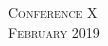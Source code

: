 \documentclass[10pt]{article} %
\begin{document}
\pagestyle{empty} %

\setlength{\parindent}{0pt} %



\begin{center}
	\textsc{\LARGE Conference X}\\ %
	\textsc{\large February 2019} %
\end{center}

\end{document}
